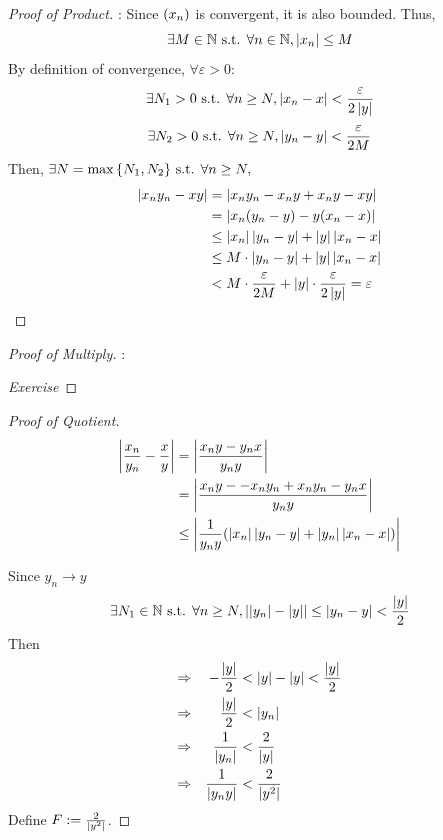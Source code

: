 \documentclass[a4paper,12pt]{article}
\begin{document}
\begin{theorem}
    \begin{proof}[Proof of Product]:
        Since \((x_{n})\) is convergent, it is also bounded. Thus,
        \[\exists M\in\mathbb{N} \text{ s.t. } \forall n\in\mathbb{N}, \left\lvert x_n\right\rvert\le M\]
        By definition of convergence, \(\forall \varepsilon>0\):
        \[\exists N_1>0\text{ s.t. } \forall n\ge N,\left\lvert x_n-x\right\rvert<\frac{\varepsilon}{2\left\lvert y\right\rvert}\]
        \[\exists N_2>0\text{ s.t. } \forall n\ge N,\left\lvert y_n-y\right\rvert<\frac{\varepsilon}{2M}\]
        Then, \(\exists N = \max{\{N_1,N_2\}}\text{ s.t. } \forall n\ge N,\)
        \begin{align*}
            \left\lvert x_n y_n-xy\right\rvert&=\left\lvert x_n y_n-x_n y+x_n y-xy\right\rvert\\
            &=\left\lvert x_n(y_n-y)-y(x_n-x)\right\rvert\\
            &\le \left\lvert x_n\right\rvert\left\lvert y_n-y\right\rvert+\left\lvert y\right\rvert\left\lvert x_n-x\right\rvert\\
            &\le M \cdot\left\lvert y_n-y\right\rvert+\left\lvert y\right\rvert \left\lvert x_n-x\right\rvert\\
            &<M\cdot \frac{\varepsilon}{2M}+\left\lvert y\right\rvert\cdot \frac{\varepsilon}{2\left\lvert y\right\rvert}=\varepsilon
        \end{align*}
    \end{proof}

    \begin{proof}[Proof of Multiply]:

        \textit{Exercise}
    \end{proof}

    \newpage
    \begin{proof}[Proof of Quotient]
        \begin{align*}
            \left\lvert \frac{x_n}{y_n}-\frac{x}{y}\right\rvert&=\left\lvert \frac{x_n y-y_n x}{y_n y}\right\rvert\\
            &=\left\lvert \frac{x_n y--x_ny_n+x_ny_n-y_n x}{y_n y}\right\rvert\\
            &\le \left\lvert \frac{1}{y_ny}(\left\lvert x_n\right\rvert\left\lvert y_n-y\right\rvert+\left\lvert y_n\right\rvert\left\lvert x_n-x\right\rvert)\right\rvert
        \end{align*}

        Since \(y_n\rightarrow y\)
        \[\exists N_1\in\mathbb{N} \text{ s.t. } \forall n\ge N, \left\lvert \left\lvert y_n\right\rvert-\left\lvert y\right\rvert\right\rvert\le\left\lvert y_n-y\right\rvert<\frac{\left\lvert y\right\rvert}{2}\]
        Then 
        \begin{align*}
            \Rightarrow&&-\frac{\left\lvert y\right\rvert}{2}&<\left\lvert y\right\rvert-\left\lvert y\right\rvert<\frac{\left\lvert y\right\rvert}{2}\\
            \Rightarrow&&\frac{\left\lvert y\right\rvert}{2}&<\left\lvert y_n\right\rvert\\
            \Rightarrow&&\frac{1}{\left\lvert y_n\right\rvert}&<\frac{2}{\left\lvert y\right\rvert}\\
            \Rightarrow&&\frac{1}{\left\lvert y_ny\right\rvert}&<\frac{2}{\left\lvert y^2\right\rvert}
        \end{align*}
        Define \(F:=\frac{2}{\left\lvert y^2\right\rvert}\).


\end{proof}
\end{theorem}
\end{document}
